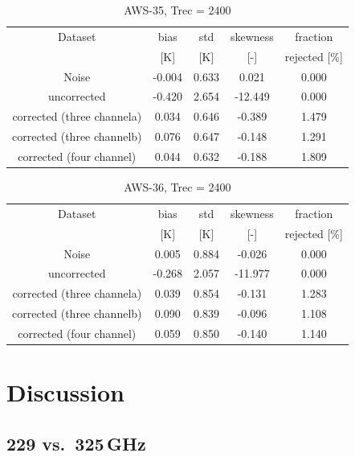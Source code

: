 \documentclass[12pt]{article}
\begin{document}
\begin{table}[!p]
	\centering
	\begin{tabular}[b]{c|c|c|c|c}
		Dataset  		  &   bias &   std &   skewness & fraction  \\
		&   [K]  &   [K] & [-] & rejected [\%]\\
		\hline
Noise                      & -0.004 & 0.633 &              0.021 &      0.000 \\
uncorrected                & -0.420 & 2.654 &            -12.449 &      0.000 \\
corrected (three channela) &  0.034 & 0.646 &             -0.389 &      1.479 \\
corrected (three channelb) &  0.076 & 0.647 &             -0.148 &      1.291 \\
corrected (four channel)   &  0.044 & 0.632 &             -0.188 &      1.809 \\
		\hline
	\end{tabular}
	\caption{ AWS-35, Trec = 2400}
	\label{tab:qrnn:C36}
\end{table}

\begin{table}[!p]
	\centering
	\begin{tabular}[b]{c|c|c|c|c}
		Dataset  		  &   bias &   std &   skewness & fraction  \\
		&   [K]  &   [K] & [-] & rejected [\%]\\
		\hline
Noise                      &  0.005 & 0.884 &             -0.026 &      0.000 \\
uncorrected                & -0.268 & 2.057 &            -11.977 &      0.000 \\
corrected (three channela) &  0.039 & 0.854 &             -0.131 &      1.283 \\
corrected (three channelb) &  0.090 & 0.839 &             -0.096 &      1.108 \\
corrected (four channel)   &  0.059 & 0.850 &             -0.140 &      1.140 \\
		\hline
	\end{tabular}
	\caption{ AWS-36, Trec = 2400 }
	\label{tab:qrnn:C36}
\end{table}

\section{Discussion}

\subsection{229 vs.\ 325\,GHz}
\end{document}

